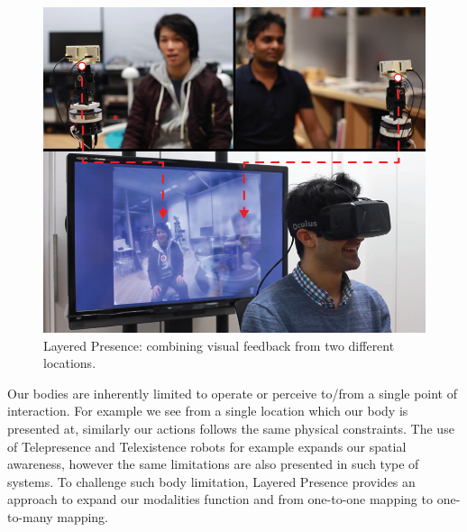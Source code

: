 \begin{figure}[htpb]
  \centering
  \includegraphics[width=0.7\linewidth]{figures/eval/Layered/Teaser.png}
\captionsetup{justification=centering}
\caption{Layered Presence: combining visual feedback from two different locations.　}
\label{fig:eval-layered-overview}
\end{figure}


Our bodies are inherently limited to operate or perceive to/from a single point of interaction. For example we see from a single location which our body is presented at, similarly our actions follows the same physical constraints. The use of Telepresence and Telexistence robots for example expands our spatial awareness, however the same limitations are also presented in such type of systems. To challenge such body limitation, Layered Presence provides an approach to expand our modalities function and from one-to-one mapping to one-to-many mapping. 

